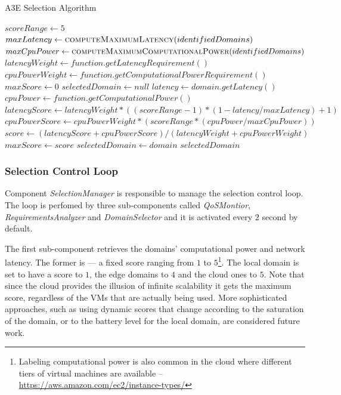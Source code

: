 \begin{algorithm}[b]
	\caption{A3E Selection Algorithm}
	\label{alg:selection}
	\begin{algorithmic}[1]
		
		\State$scoreRange \gets 5$
		\State $maxLatency \gets \Call{computeMaximumLatency}{identifiedDomains}$
		\State $maxCpuPower \gets \Call{computeMaximumComputationalPower}{identifiedDomains}$
		\State $latencyWeight \gets function.getLatencyRequirement()$ 
		\State $cpuPowerWeight \gets function.getComputationalPowerRequirement()$ 
		\State $maxScore \gets 0$
		\State $selectedDomain \gets null$
		\State $latency \gets domain.getLatency()$ 
		\State $cpuPower \gets function.getComputationalPower()$ 
		\State $latencyScore \gets latencyWeight*((scoreRange-1)*(1 - latency/maxLatency)+1)$ 
		\State $cpuPowerScore \gets cpuPowerWeight*(scoreRange*(cpuPower/maxCpuPower))$
		\State $score \gets (latencyScore + cpuPowerScore) / (latencyWeight + cpuPowerWeight)$
		\State $maxScore \gets score$
		\State $selectedDomain \gets domain$
		\EndIf
		\EndFor 
		\State \Return $selectedDomain$
		\EndFunction
	\end{algorithmic}
\end{algorithm}

\subsubsection{Selection Control Loop}

Component \textit{SelectionManager} is responsible to manage the selection control loop. The loop is perfomed by three sub-components called \textit{QoSMontior}, \textit{RequirementsAnalyzer} and \textit{DomainSelector} and it is activated every $2$ second by default.

The first sub-component retrieves the domains' computational power and network latency. The former is --- a fixed score ranging from $1$ to $5$\footnote{Labeling computational power is also common in the cloud where different tiers of virtual machines are available -- \url{https://aws.amazon.com/ec2/instance-types/}}. The local domain is set to have a score to $1$, the edge domains to $4$ and the cloud ones to $5$. Note that since the cloud provides the illusion of infinite scalability it gets the maximum score, regardless of the VMs that are actually being used. More sophisticated approaches, such as using dynamic scores that change according to the saturation of the domain, or to the battery level for the local domain, are considered future work.  
 

